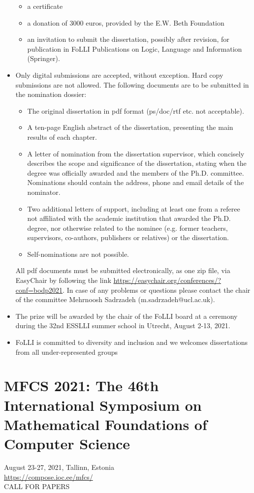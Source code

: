 \documentclass{article}
\begin{document}
\begin{itemize}
\begin{itemize}\item  a certificate
\item  a donation of 3000 euros, provided by the E.W. Beth Foundation
\item  an invitation to submit the dissertation, possibly after revision, for publication in FoLLI Publications on Logic, Language and Information (Springer).
\end{itemize} 
\item  Only digital submissions are accepted, without exception. Hard copy submissions are not allowed. The following documents are to be submitted in the nomination dossier: 
 
\begin{itemize}\item  The original dissertation in pdf format (ps/doc/rtf etc. not acceptable).
\item  A ten-page English abstract of the dissertation, presenting the main results of each chapter.
\item  A letter of nomination from the dissertation supervisor, which concisely describes the scope and significance of the dissertation, stating when the degree was officially awarded and the members of the Ph.D. committee. Nominations should contain the address, phone and email details of the nominator.
\item  Two additional letters of support, including at least one from a referee not affiliated with the academic institution that awarded the Ph.D. degree, nor otherwise related to the nominee (e.g. former teachers, supervisors, co-authors, publishers or relatives) or the dissertation.
\item  Self-nominations are not possible.
\end{itemize} 
 All pdf documents must be submitted electronically, as one zip file, via EasyChair by following the link \href{https://easychair.org/conferences/?conf=bodp2021}{https://easychair.org/conferences/?conf=bodp2021}. In case of any problems or questions please contact the chair of the committee Mehrnoosh Sadrzadeh (m.sadrzadeh@ucl.ac.uk). 
 
\item  The prize will be awarded by the chair of the FoLLI board at a ceremony during the 32nd ESSLLI summer school in Utrecht, August 2-13, 2021. 
 
\item  FoLLI is committed to diversity and inclusion and we welcomes dissertations from all under-represented groups 
 
\end{itemize}\section{MFCS 2021: The 46th International Symposium on Mathematical Foundations of Computer Science}\label{MFCS2021}  August 23-27, 2021, Tallinn, Estonia\\ 
  \href{https://compose.ioc.ee/mfcs/}{https://compose.ioc.ee/mfcs/}\\ 
CALL FOR PAPERS 
\end{document}
